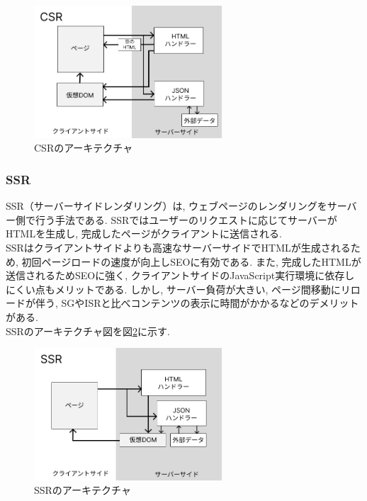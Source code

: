 \begin{figure}[htbp]
	\begin{center}
		\includegraphics[width=70mm]{./images/CSR.png}
		\caption{CSRのアーキテクチャ}\label{fig:CSR-image}
	\end{center}
\end{figure}

\subsubsection{SSR}
SSR（サーバーサイドレンダリング）は, ウェブページのレンダリングをサーバー側で行う手法である. 
SSRではユーザーのリクエストに応じてサーバーがHTMLを生成し, 完成したページがクライアントに送信される. \\
SSRはクライアントサイドよりも高速なサーバーサイドでHTMLが生成されるため, 初回ページロードの速度が向上しSEOに有効である. 
また, 完成したHTMLが送信されるためSEOに強く, クライアントサイドのJavaScript実行環境に依存しにくい点もメリットである. 
しかし, サーバー負荷が大きい, ページ間移動にリロードが伴う, SGやISRと比べコンテンツの表示に時間がかかるなどのデメリットがある. \\
SSRのアーキテクチャ図を図\ref{fig:SSR-image}に示す. 

\begin{figure}[htbp]
	\begin{center}
		\includegraphics[width=70mm]{./images/SSR.png}
		\caption{SSRのアーキテクチャ}\label{fig:SSR-image}
	\end{center}
\end{figure}

